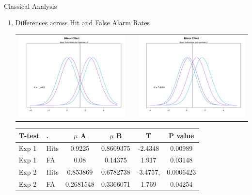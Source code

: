\documentclass[final]{beamer}
\newlength{\onecolwid}
\newlength{\twocolwid}
\begin{document}
\begin{frame}[t]
\begin{columns}[t]
\begin{column}{\twocolwid}
\begin{columns}[t,totalwidth=\twocolwid]
\begin{column}{\onecolwid}
\begin{alertblock}{Classical Analysis}
\begin{enumerate}
\item Differences across Hit and False Alarm Rates
\begin{center}
\begin{tabular}{ccc}
\includegraphics[width=0.4\linewidth]{Figures/MirrorRate_1.pdf} & \hfill & \includegraphics[width=0.4\linewidth]{Figures/MirrorRate_2.pdf}
\end{tabular}
\end{center}
\begin{table}
\vspace{3ex}
\begin{tabular}{l l | c c c c}
\toprule
\textbf{T-test} & \textbf{.} & \textbf{$\mu$ A} & \textbf{$\mu$ B} & \textbf{T} & \textbf{P value}\\
\midrule
Exp 1 & Hits & 0.9225 & 0.8609375 & -2.4348 & 0.00989 \\
Exp 1 & FA & 0.08 & 0.14375 & 1.917 & 0.03148 \\
Exp 2 & Hits & 0.853869 & 0.6782738 & -3.4757, & 0.0006423 \\
Exp 2 & FA & 0.2681548 & 0.3366071 & 1.769 & 0.04254 \\
\bottomrule
\end{tabular}
\end{table}

$\quad$


\end{enumerate}
\end{alertblock}
\end{column}
\end{columns}
\end{column}
\end{columns}
\end{frame}
\end{document}
